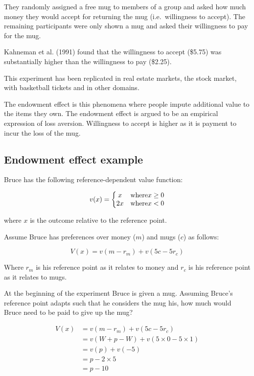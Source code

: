 \documentclass[
  letterpaper,
  DIV=11,
  numbers=noendperiod]{scrreprt}
\begin{document}
They randomly assigned a free mug to members of a group and asked how
much money they would accept for returning the mug (i.e.~willingness to
accept). The remaining participants were only shown a mug and asked
their willingness to pay for the mug.

Kahneman et al. (1991) found that the willingness to accept (\$5.75) was
substantially higher than the willingness to pay (\$2.25).

This experiment has been replicated in real estate markets, the stock
market, with basketball tickets and in other domains.

The endowment effect is this phenomena where people impute additional
value to the items they own. The endowment effect is argued to be an
empirical expression of loss aversion. Willingness to accept is higher
as it is payment to incur the loss of the mug.

\hypertarget{endowment-effect-example}{%
\subsection{Endowment effect example}\label{endowment-effect-example}}

Bruce has the following reference-dependent value function:

\[
v(x)=\left\{\begin{matrix}
x \space &\textrm{where} \space x \geq 0\\
2x \space &\textrm{where} \space x<0
\end{matrix}\right.
\]

where \(x\) is the outcome relative to the reference point.

Assume Bruce has preferences over money (\(m\)) and mugs (\(c\)) as
follows:

\[
V(x)=v(m-r_m)+v(5c-5r_c)
\]

Where \(r_m\) is his reference point as it relates to money and \(r_c\)
is his reference point as it relates to mugs.

At the beginning of the experiment Bruce is given a mug. Assuming
Bruce's reference point adapts such that he considers the mug his, how
much would Bruce need to be paid to give up the mug?

\begin{align*}
V(x)&=v(m-r_m)+v(5c-5r_c) \\
&=v(W+p-W)+v(5\times 0-5\times 1) \\
&=v(p)+v(-5) \\
&=p-2\times 5 \\
&=p-10
\end{align*}
\end{document}

